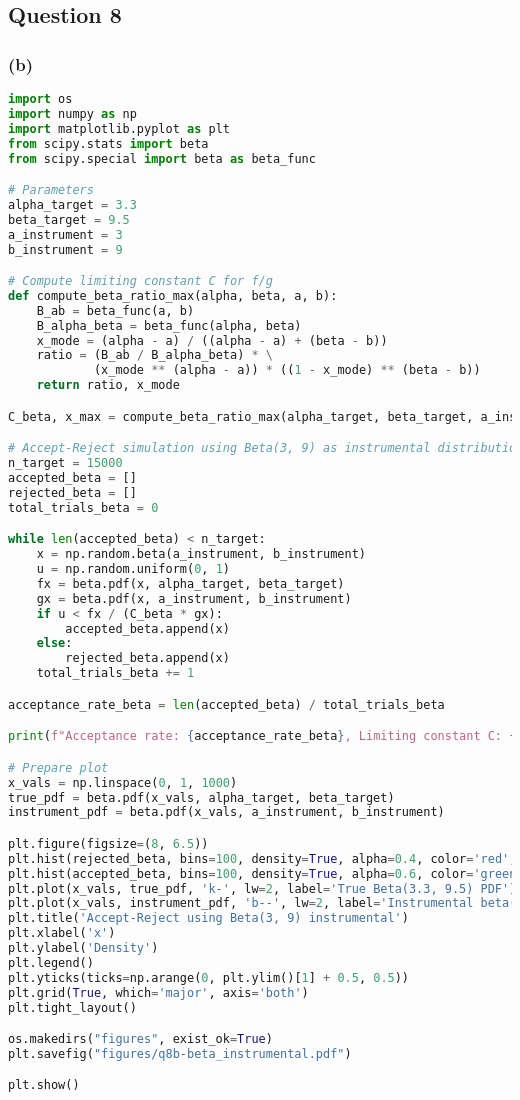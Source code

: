 \newpage
\subsection{Question 8}

\subsubsection*{(b)}

\begin{lstlisting}[language=Python]
import os
import numpy as np
import matplotlib.pyplot as plt
from scipy.stats import beta
from scipy.special import beta as beta_func

# Parameters
alpha_target = 3.3
beta_target = 9.5
a_instrument = 3
b_instrument = 9

# Compute limiting constant C for f/g
def compute_beta_ratio_max(alpha, beta, a, b):
    B_ab = beta_func(a, b)
    B_alpha_beta = beta_func(alpha, beta)
    x_mode = (alpha - a) / ((alpha - a) + (beta - b))
    ratio = (B_ab / B_alpha_beta) * \
            (x_mode ** (alpha - a)) * ((1 - x_mode) ** (beta - b))
    return ratio, x_mode

C_beta, x_max = compute_beta_ratio_max(alpha_target, beta_target, a_instrument, b_instrument)

# Accept-Reject simulation using Beta(3, 9) as instrumental distribution
n_target = 15000
accepted_beta = []
rejected_beta = []
total_trials_beta = 0

while len(accepted_beta) < n_target:
    x = np.random.beta(a_instrument, b_instrument)
    u = np.random.uniform(0, 1)
    fx = beta.pdf(x, alpha_target, beta_target)
    gx = beta.pdf(x, a_instrument, b_instrument)
    if u < fx / (C_beta * gx):
        accepted_beta.append(x)
    else:
        rejected_beta.append(x)
    total_trials_beta += 1

acceptance_rate_beta = len(accepted_beta) / total_trials_beta

print(f"Acceptance rate: {acceptance_rate_beta}, Limiting constant C: {C_beta}, Mode: {x_max}")

# Prepare plot
x_vals = np.linspace(0, 1, 1000)
true_pdf = beta.pdf(x_vals, alpha_target, beta_target)
instrument_pdf = beta.pdf(x_vals, a_instrument, b_instrument)

plt.figure(figsize=(8, 6.5))
plt.hist(rejected_beta, bins=100, density=True, alpha=0.4, color='red', label='Rejected samples')
plt.hist(accepted_beta, bins=100, density=True, alpha=0.6, color='green', label='Accepted samples')
plt.plot(x_vals, true_pdf, 'k-', lw=2, label='True Beta(3.3, 9.5) PDF')
plt.plot(x_vals, instrument_pdf, 'b--', lw=2, label='Instrumental beta(3, 9) PDF')
plt.title('Accept-Reject using Beta(3, 9) instrumental')
plt.xlabel('x')
plt.ylabel('Density')
plt.legend()
plt.yticks(ticks=np.arange(0, plt.ylim()[1] + 0.5, 0.5))
plt.grid(True, which='major', axis='both')
plt.tight_layout()

os.makedirs("figures", exist_ok=True)
plt.savefig("figures/q8b-beta_instrumental.pdf")

plt.show()
\end{lstlisting}
